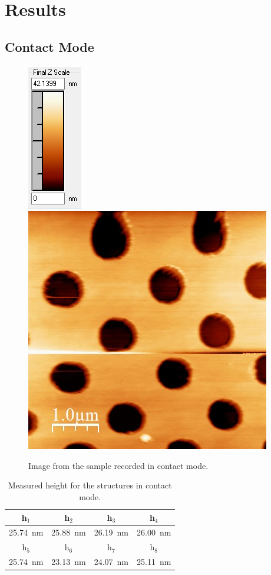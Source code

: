 \documentclass[%
 reprint,
amsmath,amssymb,
pra,
]{revtex4-1}
\begin{document}
\section{Results}
\subsection{Contact Mode}

\begin{figure}
\centering
\includegraphics[scale=0.7]{Bilder/Contact_Mode/Rohdaten/try1_scalebar.PNG}
\includegraphics[scale=0.5]{Bilder/Contact_Mode/Rohdaten/try1.JPG}
\caption{Image from the sample recorded in contact mode.}
\label{fig:Contact_raw_data}
\end{figure}

\begin{table}[h]
\centering
\begin{tabular}{|c|c|c|c|}
\hline 
h$_1$ & h$_2$ & h$_3$ & h$_4$ \\ 
\hline 
\SI{25.74}{nm} & \SI{25.88}{nm} & \SI{26.19}{nm} & \SI{26.00}{nm}  \\ 
\hline 
h$_5$ & h$_6$ & h$_7$ & h$_8$ \\ 
\hline 
\SI{25.74}{nm} & \SI{23.13}{nm} & \SI{24.07}{nm} & \SI{25.11}{nm} \\ 
\hline 
\end{tabular} 
\caption{Measured height for the structures in contact mode.}
\label{tab:Contact_height}
\end{table}
\end{document}
